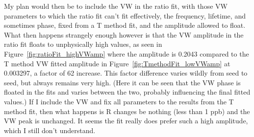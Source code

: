 \documentclass[12pt,letterpaper]{article}
\newcommand{\figref}[1]{Figure~\ref{#1}}
\begin{document}
My plan would then be to include the VW in the ratio fit, with those VW parameters to which the ratio fit can't fit effectively, the frequency, lifetime, and sometimes phase, fixed from a T method fit, and the amplitude allowed to float. What then happens strangely enough however is that the VW amplitude in the ratio fit floats to unphysically high values, as seen in \figref{fig:ratioFit_highVWamp} where the amplitude is 0.2043 compared to the T method VW fitted amplitude in \figref{fig:TmethodFit_lowVWamp} at 0.003297, a factor of 62 increase. This factor difference varies wildly from seed to seed, but always remains very high. (Here it can be seen that the VW phase is floated in the fits and varies between the two, probably influencing the final fitted values.) If I include the VW and fix all parameters to the results from the T method fit, then what happens is R changes be nothing (less than 1 ppb) and the VW peak is unchanged. It seems the fit really does prefer such a high amplitude, which I still don't understand.
\end{document}
